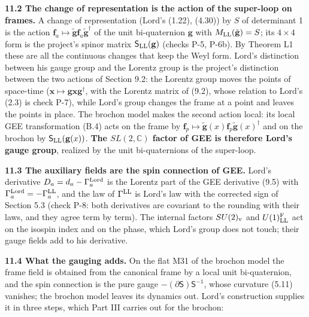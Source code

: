 \documentclass[
  10pt,
]{article}
\begin{document}
\textbf{11.2 The change of representation is the action of the
super-loop on frames.} A change of representation (Lord's (1.22),
(4.30)) by \(S\) of determinant 1 is the action
\(\mathbf f_a\mapsto\tilde{\mathbf g}\mathbf f_a\tilde{\mathbf g}^\dagger\)
of the unit bi-quaternion \(\mathbf g\) with
\(M_{\rm LL}(\tilde{\mathbf g})=S\); its \(4\times4\) form is the
project's spinor matrix \(\mathsf S_{\rm LL}(\mathbf g)\) (checks P-5,
P-6b). By Theorem L1 these are all the continuous changes that keep the
Weyl form. Lord's distinction between his gauge group and the Lorentz
group is the project's distinction between the two actions of Section
9.2: the Lorentz group moves the points of space-time
(\(\mathbf x\mapsto\mathbf g\mathbf x\mathbf g^\dagger\), with the
Lorentz matrix of (9.2), whose relation to Lord's (2.3) is check P-7),
while Lord's group changes the frame at a point and leaves the points in
place. The brochon model makes the second action local: its local GEE
transformation (B.4) acts on the frame by
\(\mathbf f_p\mapsto\tilde{\mathbf g}(x)\mathbf f_p\tilde{\mathbf g}(x)^\dagger\)
and on the brochon by \(\mathsf S_{\rm LL}(\mathbf g(x))\). \textbf{The
\(SL(2,\mathbb C)\) factor of GEE is therefore Lord's gauge group},
realized by the unit bi-quaternions of the super-loop.

\textbf{11.3 The auxiliary fields are the spin connection of GEE.}
Lord's derivative \(D_a=d_a-\Gamma^{\rm Lord}_a\) is the Lorentz part of
the GEE derivative (9.5) with
\(\Gamma^{\rm Lord}_a=-\Gamma^{\rm LL}_a\), and the law of
\(\Gamma^{\rm LL}\) is Lord's law with the corrected sign of Section 5.3
(check P-8: both derivatives are covariant to the rounding with their
laws, and they agree term by term). The internal factors
\(SU(2)_{\rm v}\) and \(U(1)^{\rm F}_{\rm LL}\) act on the isospin index
and on the phase, which Lord's group does not touch; their gauge fields
add to his derivative.

\textbf{11.4 What the gauging adds.} On the flat M31 of the brochon
model the frame field is obtained from the canonical frame by a local
unit bi-quaternion, and the spin connection is the pure gauge
\(-(\partial\mathsf S)\mathsf S^{-1}\), whose curvature (5.11) vanishes;
the brochon model leaves its dynamics out. Lord's construction supplies
it in three steps, which Part III carries out for the brochon:
\end{document}
